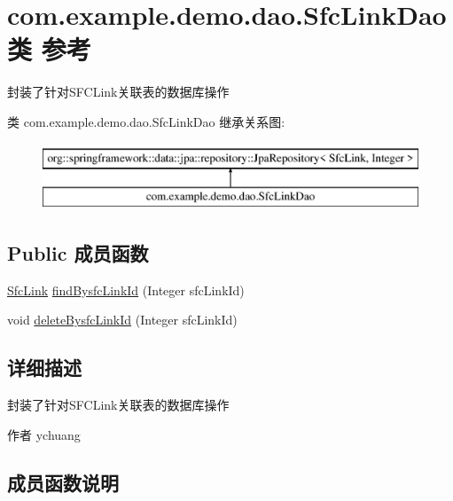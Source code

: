 \hypertarget{interfacecom_1_1example_1_1demo_1_1dao_1_1_sfc_link_dao}{}\section{com.\+example.\+demo.\+dao.\+Sfc\+Link\+Dao类 参考}
\label{interfacecom_1_1example_1_1demo_1_1dao_1_1_sfc_link_dao}


封装了针对\+S\+F\+C\+Link关联表的数据库操作  


类 com.\+example.\+demo.\+dao.\+Sfc\+Link\+Dao 继承关系图\+:\begin{figure}[H]
\begin{center}
\leavevmode
\includegraphics[height=2.000000cm]{interfacecom_1_1example_1_1demo_1_1dao_1_1_sfc_link_dao}
\end{center}
\end{figure}
\subsection*{Public 成员函数}
\begin{DoxyCompactItemize}
\item 
\mbox{\hyperlink{classcom_1_1example_1_1demo_1_1modular_1_1_sfc_link}{Sfc\+Link}} \mbox{\hyperlink{interfacecom_1_1example_1_1demo_1_1dao_1_1_sfc_link_dao_aab8d86062eea4a2c00038e4f3dd6887d}{find\+Bysfc\+Link\+Id}} (Integer sfc\+Link\+Id)
\item 
void \mbox{\hyperlink{interfacecom_1_1example_1_1demo_1_1dao_1_1_sfc_link_dao_a77d18d105fadca68d45c95c3066a2428}{delete\+Bysfc\+Link\+Id}} (Integer sfc\+Link\+Id)
\end{DoxyCompactItemize}


\subsection{详细描述}
封装了针对\+S\+F\+C\+Link关联表的数据库操作 

\begin{DoxyAuthor}{作者}
ychuang 
\end{DoxyAuthor}


\subsection{成员函数说明}
\mbox{\label{interfacecom_1_1example_1_1demo_1_1dao_1_1_sfc_link_dao_a77d18d105fadca68d45c95c3066a2428}} 
